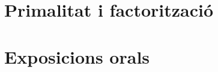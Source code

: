 \documentclass[11pt,fleqn]{book} %
\newcounter{let} \setcounter{let}{0}
\renewcommand{\1}{\mathbf{1}}
\newcommand{\0}{\mathbf{0}}
\begin{document}
\chapter{Primalitat i factorització}
{
\let\paragraph\subsubsection
\let\subsubsection\subsection
\let\subsection\section


}

\appendix

\chapter{Exposicions orals}
{
\let\paragraph\subsubsection
\let\subsubsection\subsection
\let\subsection\section


}
\end{document}
